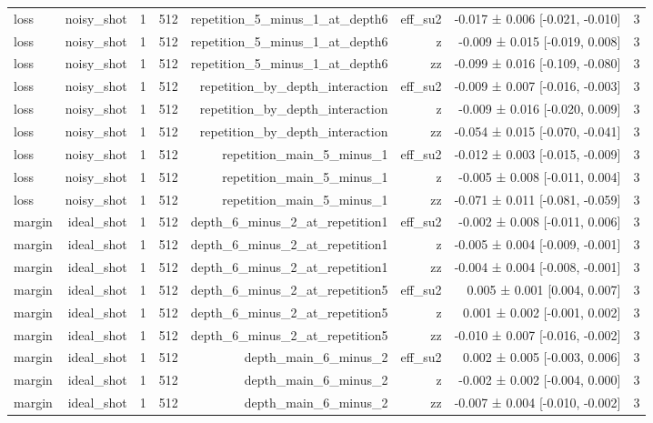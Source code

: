 \begin{table}
\begin{tabular}{lrrrrrrr}
loss & noisy\_shot & 1 & 512 & repetition\_5\_minus\_1\_at\_depth6 & eff\_su2 & -0.017 ± 0.006 [-0.021, -0.010] & 3 \\
loss & noisy\_shot & 1 & 512 & repetition\_5\_minus\_1\_at\_depth6 & z & -0.009 ± 0.015 [-0.019, 0.008] & 3 \\
loss & noisy\_shot & 1 & 512 & repetition\_5\_minus\_1\_at\_depth6 & zz & -0.099 ± 0.016 [-0.109, -0.080] & 3 \\
loss & noisy\_shot & 1 & 512 & repetition\_by\_depth\_interaction & eff\_su2 & -0.009 ± 0.007 [-0.016, -0.003] & 3 \\
loss & noisy\_shot & 1 & 512 & repetition\_by\_depth\_interaction & z & -0.009 ± 0.016 [-0.020, 0.009] & 3 \\
loss & noisy\_shot & 1 & 512 & repetition\_by\_depth\_interaction & zz & -0.054 ± 0.015 [-0.070, -0.041] & 3 \\
loss & noisy\_shot & 1 & 512 & repetition\_main\_5\_minus\_1 & eff\_su2 & -0.012 ± 0.003 [-0.015, -0.009] & 3 \\
loss & noisy\_shot & 1 & 512 & repetition\_main\_5\_minus\_1 & z & -0.005 ± 0.008 [-0.011, 0.004] & 3 \\
loss & noisy\_shot & 1 & 512 & repetition\_main\_5\_minus\_1 & zz & -0.071 ± 0.011 [-0.081, -0.059] & 3 \\
margin & ideal\_shot & 1 & 512 & depth\_6\_minus\_2\_at\_repetition1 & eff\_su2 & -0.002 ± 0.008 [-0.011, 0.006] & 3 \\
margin & ideal\_shot & 1 & 512 & depth\_6\_minus\_2\_at\_repetition1 & z & -0.005 ± 0.004 [-0.009, -0.001] & 3 \\
margin & ideal\_shot & 1 & 512 & depth\_6\_minus\_2\_at\_repetition1 & zz & -0.004 ± 0.004 [-0.008, -0.001] & 3 \\
margin & ideal\_shot & 1 & 512 & depth\_6\_minus\_2\_at\_repetition5 & eff\_su2 & 0.005 ± 0.001 [0.004, 0.007] & 3 \\
margin & ideal\_shot & 1 & 512 & depth\_6\_minus\_2\_at\_repetition5 & z & 0.001 ± 0.002 [-0.001, 0.002] & 3 \\
margin & ideal\_shot & 1 & 512 & depth\_6\_minus\_2\_at\_repetition5 & zz & -0.010 ± 0.007 [-0.016, -0.002] & 3 \\
margin & ideal\_shot & 1 & 512 & depth\_main\_6\_minus\_2 & eff\_su2 & 0.002 ± 0.005 [-0.003, 0.006] & 3 \\
margin & ideal\_shot & 1 & 512 & depth\_main\_6\_minus\_2 & z & -0.002 ± 0.002 [-0.004, 0.000] & 3 \\
margin & ideal\_shot & 1 & 512 & depth\_main\_6\_minus\_2 & zz & -0.007 ± 0.004 [-0.010, -0.002] & 3 \\

\end{tabular}
\end{table}
